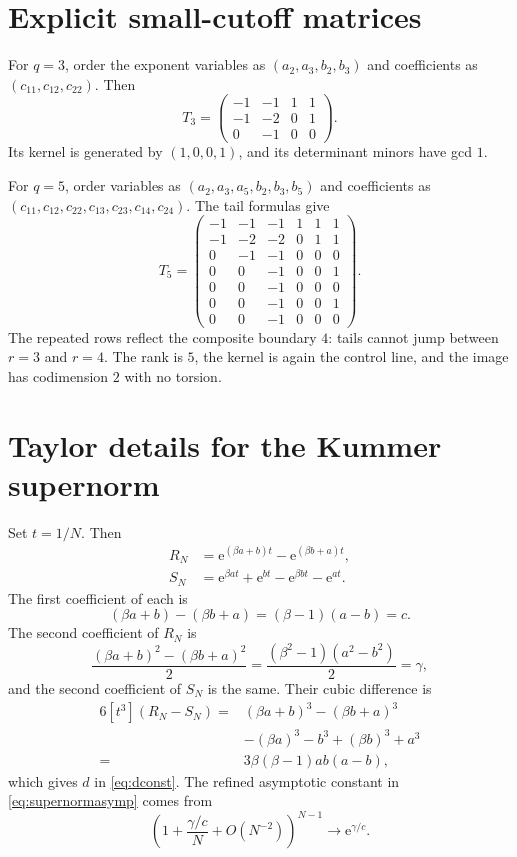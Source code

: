 \documentclass[11pt]{article}
\theoremstyle{definition}
\theoremstyle{remark}
\newcommand{\e}{\mathrm e}
\begin{document}
\appendix

\section{Explicit small-cutoff matrices}\label{app:matrices}

For $q=3$, order the exponent variables as
$(a_2,a_3,b_2,b_3)$ and coefficients as $(c_{11},c_{12},c_{22})$.  Then
\[
 T_3=
 \begin{pmatrix}
 -1&-1&1&1\\
 -1&-2&0&1\\
 0&-1&0&0
 \end{pmatrix}.
\]
Its kernel is generated by $(1,0,0,1)$, and its determinant minors have gcd $1$.

For $q=5$, order variables as
$(a_2,a_3,a_5,b_2,b_3,b_5)$ and coefficients as
$(c_{11},c_{12},c_{22},c_{13},c_{23},c_{14},c_{24})$.  The tail formulas give
\[
 T_5=
 \begin{pmatrix}
 -1&-1&-1&1&1&1\\
 -1&-2&-2&0&1&1\\
 0&-1&-1&0&0&0\\
 0&0&-1&0&0&1\\
 0&0&-1&0&0&0\\
 0&0&-1&0&0&1\\
 0&0&-1&0&0&0
 \end{pmatrix}.
\]
The repeated rows reflect the composite boundary $4$: tails cannot jump between
$r=3$ and $r=4$.  The rank is $5$, the kernel is again the control line, and the
image has codimension $2$ with no torsion.

\section{Taylor details for the Kummer supernorm}\label{app:taylor}

Set $t=1/N$.  Then
\begin{align*}
 R_N&=\e^{(\beta a+b)t}-\e^{(\beta b+a)t},\\
 S_N&=\e^{\beta at}+\e^{bt}-\e^{\beta bt}-\e^{at}.
\end{align*}
The first coefficient of each is
\[
 (\beta a+b)-(\beta b+a)=(\beta-1)(a-b)=c.
\]
The second coefficient of $R_N$ is
\[
 \frac{(\beta a+b)^2-(\beta b+a)^2}{2}
 =\frac{(\beta^2-1)(a^2-b^2)}2=\gamma,
\]
and the second coefficient of $S_N$ is the same.  Their cubic difference is
\begin{align*}
 6[t^3](R_N-S_N)
 ={}&(\beta a+b)^3-(\beta b+a)^3\\
 &-(\beta a)^3-b^3+(\beta b)^3+a^3\\
 ={}&3\beta(\beta-1)ab(a-b),
\end{align*}
which gives $d$ in \eqref{eq:dconst}.  The refined asymptotic constant in
\eqref{eq:supernormasymp} comes from
\[
 \left(1+\frac{\gamma/c}{N}+O(N^{-2})\right)^{N-1}
 \longrightarrow\e^{\gamma/c}.
\]
\end{document}
